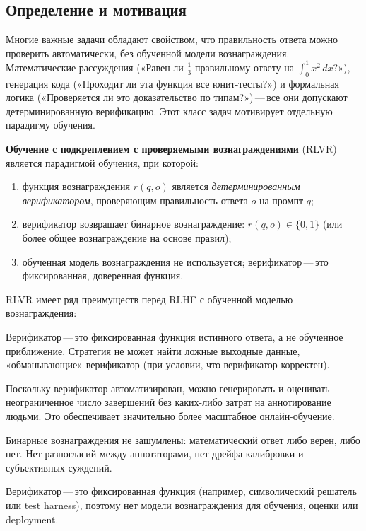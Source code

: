 \subsection{Определение и мотивация}

Многие важные задачи обладают свойством, что правильность ответа можно проверить автоматически, без обученной модели вознаграждения. Математические рассуждения («Равен ли $\frac{1}{3}$ правильному ответу на $\int_0^1 x^2\,dx$?»), генерация кода («Проходит ли эта функция все юнит-тесты?») и формальная логика («Проверяется ли это доказательство по типам?»)\,---\,все они допускают детерминированную верификацию. Этот класс задач мотивирует отдельную парадигму обучения.

\begin{definition}[RLVR]
\label{def:rlvr}
\textbf{Обучение с подкреплением с проверяемыми вознаграждениями} (RLVR) является парадигмой обучения, при которой:
\begin{enumerate}[leftmargin=*]
  \item функция вознаграждения $r(q, o)$ является \emph{детерминированным верификатором}, проверяющим правильность ответа $o$ на промпт $q$;
  \item верификатор возвращает бинарное вознаграждение: $r(q, o) \in \{0, 1\}$ (или более общее вознаграждение на основе правил);
  \item обученная модель вознаграждения не используется; верификатор\,---\,это фиксированная, доверенная функция.
\end{enumerate}
\end{definition}

RLVR имеет ряд преимуществ перед RLHF с обученной моделью вознаграждения:
\begin{description}[leftmargin=!,labelwidth=3.5cm,align=parleft]
  \item[Нет взлома вознаграждения] Верификатор\,---\,это фиксированная функция истинного ответа, а не обученное приближение. Стратегия не может найти ложные выходные данные, «обманывающие» верификатор (при условии, что верификатор корректен).
  \item[Неограниченные данные] Поскольку верификатор автоматизирован, можно генерировать и оценивать неограниченное число завершений без каких-либо затрат на аннотирование людьми. Это обеспечивает значительно более масштабное онлайн-обучение.
  \item[Чистый сигнал] Бинарные вознаграждения не зашумлены: математический ответ либо верен, либо нет. Нет разногласий между аннотаторами, нет дрейфа калибровки и субъективных суждений.
  \item[Нет обучения модели вознаграждения] Верификатор\,---\,это фиксированная функция (например, символический решатель или test harness), поэтому нет модели вознаграждения для обучения, оценки или deployment.
\end{description}

